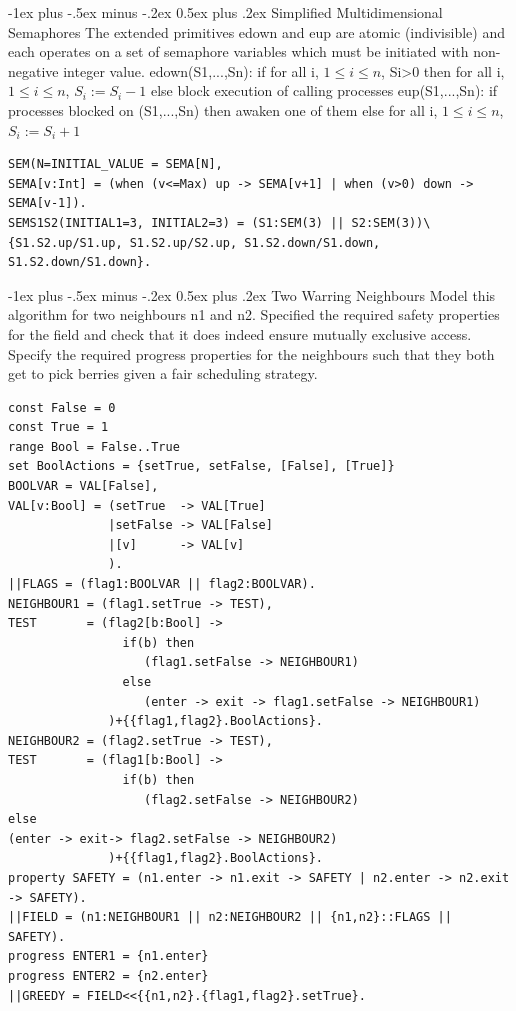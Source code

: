 \documentclass[letterpaper, 8pt]{extarticle}
\makeatletter
\renewcommand{\section}{\@startsection{section}{1}{0mm}%
                                {-1ex plus -.5ex minus -.2ex}%
                                {0.5ex plus .2ex}%
                                {\normalfont\normalsize\bfseries}}
\makeatother
\begin{document}
\begin{multicols*}{5}
\section{Simplified Multidimensional Semaphores}
The extended primitives edown and eup are atomic (indivisible) and each operates on a set of semaphore variables which must be initiated with non-negative integer value. edown(S1,...,Sn): if for all i, $1\leq i\leq n$, Si>0 then for all i, $1\leq i\leq n$, $S_i := S_i -1$ else block execution of calling processes eup(S1,...,Sn): if processes blocked on (S1,...,Sn) then awaken one of them else for all i, $1\leq i\leq n$, $S_i := S_i +1$
\begin{lstlisting}
SEM(N=INITIAL_VALUE = SEMA[N],
SEMA[v:Int] = (when (v<=Max) up -> SEMA[v+1] | when (v>0) down -> SEMA[v-1]).
SEMS1S2(INITIAL1=3, INITIAL2=3) = (S1:SEM(3) || S2:SEM(3))\{S1.S2.up/S1.up, S1.S2.up/S2.up, S1.S2.down/S1.down, S1.S2.down/S1.down}.
\end{lstlisting} %

\section{Two Warring Neighbours}
Model this algorithm for two neighbours n1 and n2. Specified the required safety properties for the field and check that it does indeed ensure mutually exclusive access. Specify the required progress properties for the neighbours such that they both get to pick berries given a fair scheduling strategy.
\begin{lstlisting}
const False = 0
const True = 1
range Bool = False..True
set BoolActions = {setTrue, setFalse, [False], [True]}
BOOLVAR = VAL[False],
VAL[v:Bool] = (setTrue  -> VAL[True]
              |setFalse -> VAL[False]
              |[v]      -> VAL[v]
              ).
||FLAGS = (flag1:BOOLVAR || flag2:BOOLVAR).
NEIGHBOUR1 = (flag1.setTrue -> TEST),
TEST       = (flag2[b:Bool] ->
                if(b) then
                   (flag1.setFalse -> NEIGHBOUR1)
                else
                   (enter -> exit -> flag1.setFalse -> NEIGHBOUR1)
              )+{{flag1,flag2}.BoolActions}.
NEIGHBOUR2 = (flag2.setTrue -> TEST),
TEST       = (flag1[b:Bool] ->
                if(b) then
                   (flag2.setFalse -> NEIGHBOUR2)
else
(enter -> exit-> flag2.setFalse -> NEIGHBOUR2)
              )+{{flag1,flag2}.BoolActions}.
property SAFETY = (n1.enter -> n1.exit -> SAFETY | n2.enter -> n2.exit -> SAFETY).
||FIELD = (n1:NEIGHBOUR1 || n2:NEIGHBOUR2 || {n1,n2}::FLAGS || SAFETY).
progress ENTER1 = {n1.enter} 
progress ENTER2 = {n2.enter}
||GREEDY = FIELD<<{{n1,n2}.{flag1,flag2}.setTrue}.
\end{lstlisting}


\end{multicols*}
\end{document}
